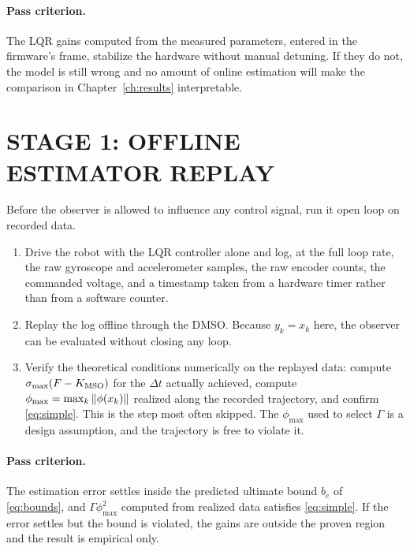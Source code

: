 \paragraph{Pass criterion.} The LQR gains computed from the measured
parameters, entered in the firmware's frame, stabilize the hardware without
manual detuning. If they do not, the model is
still wrong and no amount of online estimation will make the comparison in
Chapter~\ref{ch:results} interpretable.

\section{STAGE 1: OFFLINE ESTIMATOR REPLAY}

Before the observer is allowed to influence any control signal, run it open
loop on recorded data.

\begin{enumerate}[label=\arabic*.,leftmargin=*]

\item Drive the robot with the LQR controller alone and log, at the full loop
rate, the raw gyroscope and accelerometer samples, the raw encoder counts, the
commanded voltage, and a timestamp taken from a hardware timer rather than from
a software counter.

\item Replay the log offline through the DMSO. Because $y_k=x_k$ here, the
observer can be evaluated without closing any loop.

\item Verify the theoretical conditions numerically on the replayed data:
compute $\sigma_{\max}(F-K_{\mathrm{MSO}})$ for the $\Delta t$ actually achieved, compute
$\phi_{\max}=\max_k\left\lVert \phi(x_k) \right\rVert$ realized along the recorded trajectory, and
confirm \eqref{eq:simple}. This is the step most often skipped. The
$\phi_{\max}$ used to select $\Gamma$ is a design assumption, and the trajectory
is free to violate it.

\end{enumerate}

\paragraph{Pass criterion.} The estimation error settles inside the predicted
ultimate bound $b_e$ of \eqref{eq:bounds}, and $\Gamma\phi_{\max}^2$ computed
from realized data satisfies \eqref{eq:simple}. If the error settles but the
bound is violated, the gains are outside the proven region and the result is
empirical only.


